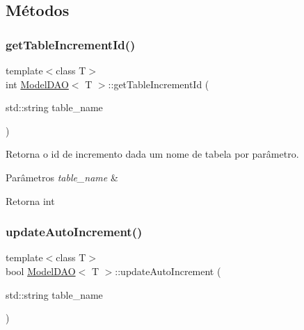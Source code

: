 \subsection{Métodos}
\mbox{\label{classModelDAO_a24cf7f88d833dba6424271767403cbda}} 
\subsubsection{\texorpdfstring{get\+Table\+Increment\+Id()}{getTableIncrementId()}}
{\footnotesize\ttfamily template$<$class T$>$ \\
int \hyperlink{classModelDAO}{Model\+D\+AO}$<$ T $>$\+::get\+Table\+Increment\+Id (\begin{DoxyParamCaption}\item[{std\+::string}]{table\+\_\+name }\end{DoxyParamCaption})\hspace{0.3cm}{\ttfamily [inline]}}



Retorna o id de incremento dada um nome de tabela por parâmetro. 


\begin{DoxyParams}{Parâmetros}
{\em table\+\_\+name} & \\
\hline
\end{DoxyParams}
\begin{DoxyReturn}{Retorna}
int 
\end{DoxyReturn}
\mbox{\label{classModelDAO_af524ba9765af94ca633587d3ecf8964b}} 
\subsubsection{\texorpdfstring{update\+Auto\+Increment()}{updateAutoIncrement()}}
{\footnotesize\ttfamily template$<$class T$>$ \\
bool \hyperlink{classModelDAO}{Model\+D\+AO}$<$ T $>$\+::update\+Auto\+Increment (\begin{DoxyParamCaption}\item[{std\+::string}]{table\+\_\+name }\end{DoxyParamCaption})\hspace{0.3cm}{\ttfamily [inline]}}



